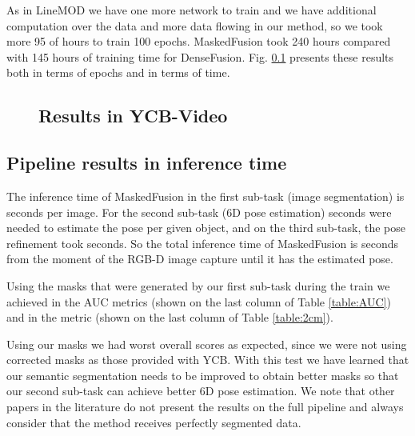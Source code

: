 \documentclass[runningheads]{llncs}
\begin{document}
As in LineMOD we have one more network to train and we have additional computation over the data and more data flowing in our method, so we took more 95 of hours to train 100 epochs.
MaskedFusion took 240 hours compared with 145 hours of training time for DenseFusion.
Fig. \ref{fig:plotycb} presents these results both in terms of epochs and in terms of time.

\begin{figure}[thpb]
\vspace{-2em}
    \centering
    \qquad
    \subsection{Results in YCB-Video}
    \label{fig:plotycb}
\end{figure}


\subsection{Pipeline results in inference time}
\label{sec:inference}
The inference time of MaskedFusion in the first sub-task (image segmentation) is  seconds per image.
For the second sub-task (6D pose estimation)  seconds were needed to estimate the pose per given object, and on the third sub-task, the pose refinement took  seconds.
So the total inference time of MaskedFusion is  seconds from the moment of the RGB-D image capture until it has the estimated pose.

Using the masks that were generated by our first sub-task during the train we achieved  in the AUC metrics (shown on the last column of Table \ref{table:AUC}) and  in the  metric (shown on the last column of Table \ref{table:2cm}).

Using our masks we had worst overall scores as expected, since we were not using corrected
masks as those provided with YCB.
With this test we have learned that our semantic segmentation needs to be improved to obtain better masks so that our second sub-task can achieve better 6D pose estimation.
We note that other papers in the literature do not present the results on the full pipeline and always consider that the method receives perfectly segmented data.
\end{document}

